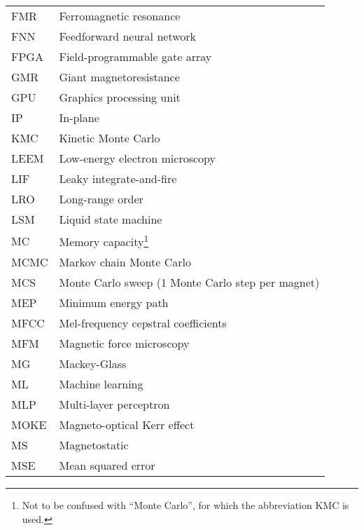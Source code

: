 {\begin{longtable}[l]{ll}
        FMR   & Ferromagnetic resonance                     \\
        FNN   & Feedforward neural network                  \\
        FPGA  & Field-programmable gate array               \\
        GMR   & Giant magnetoresistance                     \\
        GPU   & Graphics processing unit                    \\
        IP    & In-plane                                    \\
        KMC   & Kinetic Monte Carlo                         \\
        LEEM  & Low-energy electron microscopy              \\
        LIF   & Leaky integrate-and-fire                    \\
        LRO   & Long-range order                            \\
        LSM   & Liquid state machine                        \\
        MC    & Memory capacity\footnote{Not to be confused with ``Monte Carlo'', for which the abbreviation KMC is used.} \\
        MCMC  & Markov chain Monte Carlo                    \\
        MCS   & Monte Carlo sweep (1 Monte Carlo step per magnet) \\
        MEP   & Minimum energy path                         \\
        MFCC  & Mel-frequency cepstral coefficients         \\
        MFM   & Magnetic force microscopy                   \\
        MG    & Mackey-Glass                                \\
        ML    & Machine learning                            \\
        MLP   & Multi-layer perceptron                      \\
        MOKE  & Magneto-optical Kerr effect                 \\
        MS    & Magnetostatic                               \\
        MSE   & Mean squared error                          \\

\end{longtable}}
